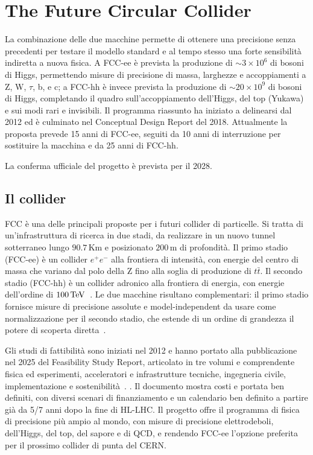 \section{The Future Circular Collider}
\label{sec:fcc}
La combinazione delle due macchine permette di ottenere una precisione senza precedenti per testare il modello standard e al tempo stesso una forte sensibilità indiretta a nuova fisica. A FCC-ee è prevista la produzione di $\sim3\times10^6$ di bosoni di Higgs, permettendo misure di precisione di massa, larghezze e accoppiamenti a Z, W, $\tau$, b, e c; a FCC-hh è invece prevista la produzione di $\sim20\times10^9$ di bosoni di Higgs, completando il quadro sull'accoppiamento dell'Higgs, del top (Yukawa) e sui modi rari e invisibili. Il programma riassunto ha iniziato a delinearsi dal 2012 ed è culminato nel Conceptual Design Report del 2018. Attualmente la proposta prevede 15 anni di FCC-ee, seguiti da 10 anni di interruzione per sostituire la macchina e da 25 anni di FCC-hh.

La conferma ufficiale del progetto è prevista per il 2028.

\subsection{Il collider}
FCC è una delle principali proposte per i futuri collider di particelle. Si tratta di un'infrastruttura di ricerca in due stadi, da realizzare in un nuovo tunnel sotterraneo lungo $90.7\,\mathrm{Km}$ e posizionato $200\,\mathrm{m}$ di profondità. Il primo stadio (FCC-ee) è un collider $e^+e^-$ alla frontiera di intensità, con energie del centro di massa che variano dal polo della Z fino alla soglia di produzione di $t\bar t$. Il secondo stadio (FCC-hh) è un collider adronico alla frontiera di energia, con energie dell'ordine di $100\,\mathrm{TeV}$~\cite{FCC:FSR-v1,ESPP:2026-Res}. Le due macchine risultano complementari: il primo stadio fornisce misure di precisione assolute e model-independent da usare come normalizzazione per il secondo stadio, che estende di un ordine di grandezza il potere di scoperta diretta~\cite{FCC:FSR-v1}.

Gli studi di fattibilità sono iniziati nel 2012 e hanno portato alla pubblicazione nel 2025 del Feasibility Study Report, articolato in tre volumi e comprendente fisica ed esperimenti, acceleratori e infrastrutture tecniche, ingegneria civile, implementazione e sostenibilità~\cite{FCC:FSR-v1}. . Il documento mostra costi e portata ben definiti, con diversi scenari di finanziamento e un calendario ben definito a partire già da 5/7 anni dopo la fine di HL-LHC. Il progetto offre il programma di fisica di precisione più ampio al mondo, con misure di precisione elettrodeboli, dell'Higgs, del top, del sapore e di QCD, e rendendo FCC-ee l'opzione preferita per il prossimo collider di punta del CERN.

